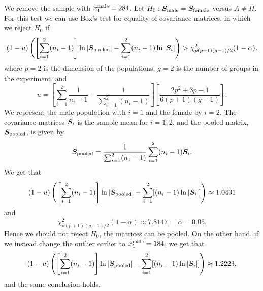 We remove the sample with $x^{\rm male}_{1} = 284$.
Let $H_{0}: \bm{S}_{\rm male} = \bm{S}_{\rm female}$ versus $A \neq
H$. For this test we can use Box's test for equality of covariance
matrices, in which we reject $H_{0}$ if 
\begin{equation*}\label{eq:boxcorrection}
  (1 - u)
  \left(
    \left[
      \sum_{i=1}^{2}(n_{i} - 1)
    \right]
    \ln \left| \bm{S}_{\rm pooled} \right| - \sum_{i=1}^{2}(n_{i}-1) \ln \left| \bm{S}_{i} \right|
  \right) > \chi^{2}_{p(p+1)(g-1)/2}(1-\alpha),
\end{equation*}
where $p=2$ is the dimension of the populations, $g = 2$ is the
number of groups in the experiment, and
\begin{equation*}
  u = 
  \left[
    \sum_{i=1}^{2}\frac{1}{n_{i}-1} - \frac{1}{\sum_{i=1}^{2}(n_{i}-1)}
  \right]
  \left[
    \frac{2p^{2} + 3p - 1}{6(p+1)(g-1)}
  \right].
\end{equation*}
We represent the male population with $i=1$ and the female by
$i=2$. The covariance matrices $\bm{S}_{i}$ is the sample mean for $i =
1,2$, and the pooled matrix, $\bm{S}_{\rm pooled}$, is given by 
\begin{equation*}
  \bm{S}_{\rm pooled}=  \frac{1}{\sum_{i=1}^{2}(n_{1} -
    1)}\sum_{i=1}^{2}(n_{i}-1)\bm{S}_{i}  .
\end{equation*}
We get that 
\begin{equation*}
    (1 - u)
  \left(
    \left[
      \sum_{i=1}^{2}(n_{i} - 1)
    \right]
    \ln \left| \bm{S}_{\rm pooled} \right| - \sum_{i=1}^{2}[(n_{i}-1) \ln \left| \bm{S}_{i} \right|]
  \right) \approx 1.0431
\end{equation*}
and
\begin{equation*}
  \chi^{2}_{p(p+1)(g-1)/2}(1-\alpha) \approx 7.8147 , \quad \alpha =0.05.
\end{equation*}
Hence we should not reject $H_{0}$, the matrices can be pooled. On the
other hand, if we  instead change the outlier earlier to
$x_{1}^{\rm male} = 184$, we get that 
\begin{equation*}
    (1 - u)
  \left(
    \left[
      \sum_{i=1}^{2}(n_{i} - 1)
    \right]
    \ln \left| \bm{S}_{\rm pooled} \right| - \sum_{i=1}^{2}[(n_{i}-1) \ln \left| \bm{S}_{i} \right|]
  \right) \approx 1.2223,
\end{equation*}
and the same conclusion holds.
